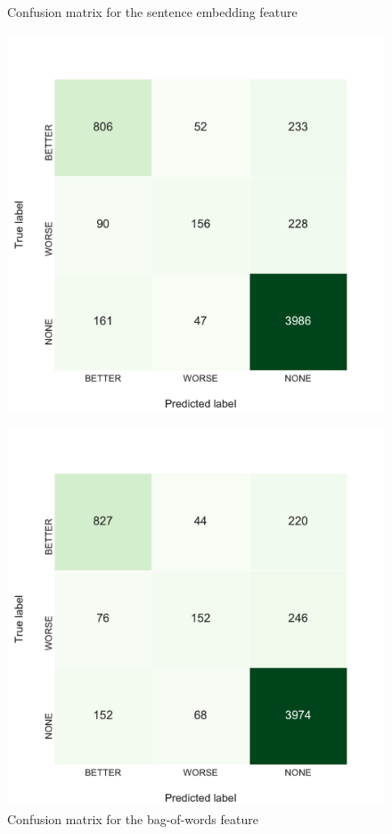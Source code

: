 \begin{figure}[h]
    \begin{minipage}{.5\linewidth}
   \caption{Confusion matrix for the sentence embedding feature} 
    \label{fig:3_conf_inf}
 \centering
	\includegraphics[width=1\linewidth]{images/experiments/conf-InferSent_False}
  \end{minipage} \hfill
    \begin{minipage}{.5\linewidth}
  
     \caption{Confusion matrix for the bag-of-words feature} 
       \label{fig:3_conf_uni}
 \centering
	\includegraphics[width=1\linewidth]{images/experiments/conf-Bag-Of-Words_False}
    \end{minipage} 
\end{figure}

